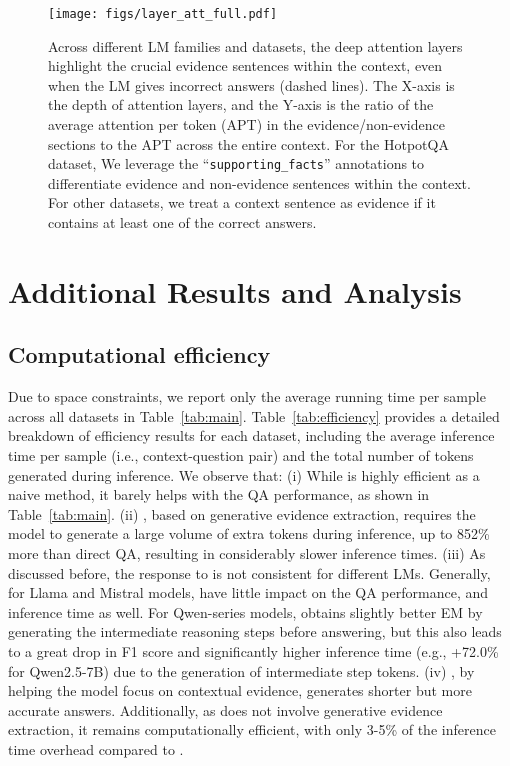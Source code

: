 \begin{figure*}[t]
\vspace{-5pt}
    \centering
    \texttt{[image: figs/layer\_att\_full.pdf]}
    \caption[evidence reading layers]{
        Across different LM families and datasets, the deep attention layers highlight the crucial evidence sentences within the context, even when the LM gives incorrect answers (dashed lines).
        The X-axis is the depth of attention layers, and the Y-axis is the ratio of the average attention per token (APT) in the evidence/non-evidence sections to the APT across the entire context.
        For the HotpotQA~\cite{yang2018hotpotqa} dataset, We leverage the ``\texttt{supporting\_facts}'' annotations to differentiate evidence and non-evidence sentences within the context.
        For other datasets, we treat a context sentence as evidence if it contains at least one of the correct answers.
    }
    \label{fig:layeratt-full}
\vspace{-5pt}
\end{figure*}

\section{Additional Results and Analysis}
\label{sec:apd-res}

\subsection{Computational efficiency}\label{sec:apd-res-eff}
Due to space constraints, we report only the average running time per sample across all datasets in Table~\ref{tab:main}. Table~\ref{tab:efficiency} provides a detailed breakdown of efficiency results for each dataset, including the average inference time per sample (i.e., context-question pair) and the total number of tokens generated during inference.
We observe that: 
(i) While \fe is highly efficient as a naive method, it barely helps with the QA performance, as shown in Table~\ref{tab:main}. 
(ii) \pe, based on generative evidence extraction, requires the model to generate a large volume of extra tokens during inference, up to 852\% more than direct QA, resulting in considerably slower inference times. 
(iii) As discussed before, the response to \co is not consistent for different LMs. Generally, for Llama and Mistral models, \co have little impact on the QA performance, and inference time as well. For Qwen-series models, \co obtains slightly better EM by generating the intermediate reasoning steps before answering, but this also leads to a great drop in F1 score and significantly higher inference time (e.g., +72.0\% for Qwen2.5-7B) due to the generation of intermediate step tokens.
(iv) \se, by helping the model focus on contextual evidence, generates shorter but more accurate answers. Additionally, as \se does not involve generative evidence extraction, it remains computationally efficient, with only 3-5\% of the inference time overhead compared to \pe.



